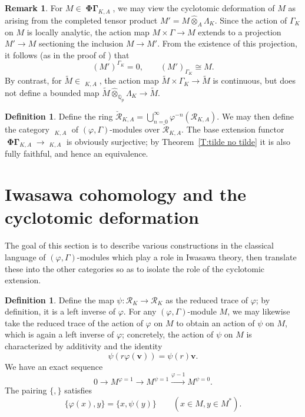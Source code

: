 \documentclass[12pt]{amsart}
\theoremstyle{definition}
\newtheorem{defn}[theorem]{Definition}
\newtheorem{remark}[theorem]{Remark}
\numberwithin{equation}{theorem}
\newcommand{\bv}{\mathbf{v}}
\newcommand{\QQ}{\mathbb{Q}}
\newcommand{\calR}{\mathcal{R}}
\DeclareMathOperator{\PhiGamma}{\mathbf{\Phi \Gamma}}
\DeclareMathOperator{\PhiGammabreve}{\breve{\mathbf{\Phi \Gamma}}}
\DeclareMathOperator{\PhiGammatilde}{\widetilde{\mathbf{\Phi \Gamma}}}
\begin{document}
\begin{remark}
For $M \in \PhiGamma_{K,A}$, we may view the cyclotomic deformation of $M$ as arising from the completed tensor product $M' = M \widehat{\otimes}_{A} \Lambda_K$. Since the action of $\Gamma_K$ on $M$ is locally analytic, the action map $M \times \Gamma \to M$ extends to a projection $M' \to M$ sectioning the inclusion $M \to M'$. From the existence of this projection, it follows (as in the proof of \cite[Theorem~4.4.8]{kpx}) that 
\[
(M')^{\Gamma_K} = 0, \qquad (M')_{\Gamma_K} \cong M.
\]
By contrast, for $\tilde{M} \in \PhiGammatilde_{K,A}$, the action map
$\tilde{M} \times \Gamma_K \to \tilde{M}$ is continuous, but does not define a bounded map
$\tilde{M} \widehat{\otimes}_{\QQ_p} \Lambda_K \to \tilde{M}$.
\end{remark}

\begin{defn}
Define the ring $\breve{\calR}_{K,A} = \bigcup_{n=0}^\infty \varphi^{-n}(\calR_{K,A})$.
We may then define the category $\PhiGammabreve_{K,A}$ of $(\varphi, \Gamma)$-modules over $\breve{\calR}_{K,A}$. The base extension functor $\PhiGamma_{K,A} \to \PhiGammabreve_{K,A}$ is obviously surjective; by Theorem~\ref{T:tilde no tilde} it is also fully faithful, and hence an equivalence.
\end{defn}

\section{Iwasawa cohomology and the cyclotomic deformation}

The goal of this section is to describe various constructions in the classical language of $(\varphi, \Gamma)$-modules which play a role in Iwasawa theory, then translate these into the other categories so as to isolate the role of the cyclotomic extension.

\begin{defn}
Define the map $\psi: \calR_K \to \calR_K$ as the reduced trace of $\varphi$; by definition, it is a left inverse of $\varphi$. For any $(\varphi, \Gamma)$-module $M$,
we may likewise take the reduced trace of the action of $\varphi$ on $M$ to obtain an action of $\psi$ on $M$, which is again a left inverse of $\varphi$;
concretely, the action of $\psi$ on $M$ is characterized by additivity and the identity
\[
\psi(r \varphi(\bv)) = \psi(r) \bv.
\]
We have an exact sequence
\begin{equation} \label{eq:psi sequence}
0 \to M^{\varphi=1} \to M^{\psi=1} \stackrel{\varphi-1}{\longrightarrow} M^{\psi=0}.
\end{equation}
The pairing $\{, \}$ satisfies
\begin{equation} \label{eq:pairing phi psi}
\{\varphi(x), y\} = \{x, \psi(y)\} \qquad (x \in M, y \in M^*).
\end{equation}
\end{defn}
\end{document}
